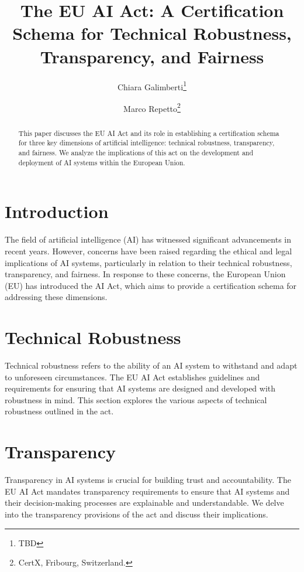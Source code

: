 \documentclass{article}
\title{The EU AI Act: A Certification Schema for Technical Robustness, Transparency, and Fairness}
\author{Chiara Galimberti\thanks{TBD} \and Marco Repetto\thanks{CertX, Fribourg, Switzerland.}}
\begin{document}
	
\maketitle


\begin{abstract}

This paper discusses the EU AI Act and its role in establishing a certification schema for three key dimensions of artificial intelligence: technical robustness, transparency, and fairness. We analyze the implications of this act on the development and deployment of AI systems within the European Union.

\end{abstract}


\section{Introduction}

The field of artificial intelligence (AI) has witnessed significant advancements in recent years. However, concerns have been raised regarding the ethical and legal implications of AI systems, particularly in relation to their technical robustness, transparency, and fairness. In response to these concerns, the European Union (EU) has introduced the AI Act, which aims to provide a certification schema for addressing these dimensions.


\section{Technical Robustness}

Technical robustness refers to the ability of an AI system to withstand and adapt to unforeseen circumstances. The EU AI Act establishes guidelines and requirements for ensuring that AI systems are designed and developed with robustness in mind. This section explores the various aspects of technical robustness outlined in the act.


\section{Transparency}

Transparency in AI systems is crucial for building trust and accountability. The EU AI Act mandates transparency requirements to ensure that AI systems and their decision-making processes are explainable and understandable. We delve into the transparency provisions of the act and discuss their implications. \cite{barredoarrieta_2020}
\end{document}
